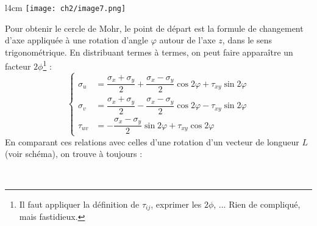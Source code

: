 \begin{wrapfigure}[7]{l}{4cm}
	\texttt{[image: ch2/image7.png]}
\end{wrapfigure}
Pour obtenir le cercle de Mohr, le point de départ est la formule de changement d'axe appliquée à une
rotation d'angle $\varphi$ autour de l'axe $z$, dans le sens trigonométrique. En distribuant termes à
termes, on peut faire apparaître un facteur $2\phi$\footnote{Il faut appliquer la définition de 
	$\tau_{ij}$, exprimer les $2\phi$, ... Rien de compliqué, mais fastidieux.} :
\begin{equation}
	\left\{\begin{array}{ll}
	\sigma_u &=  \dfrac{\sigma_x+\sigma_y}{2} + \dfrac{\sigma_x-\sigma_y}{2}\cos 2\varphi + \tau_{xy}\sin
	2\varphi\\
	\sigma_v &=  \dfrac{\sigma_x+\sigma_y}{2} - \dfrac{\sigma_x-\sigma_y}{2}\cos 2\varphi - \tau_{xy}\sin
	2\varphi\\
	\tau_{uv} &= -\dfrac{\sigma_x-\sigma_y}{2}\sin 2\varphi + \tau_{xy}\cos 2\varphi
	\end{array}\right.
\end{equation}
En comparant ces relations avec celles d'une rotation d'un vecteur de longueur $L$ (voir schéma), on
trouve à toujours :
    
\ \\
    
